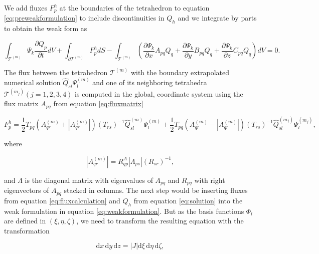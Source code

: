 We add fluxes $F_p^h$ at the boundaries of the tetrahedron to equation \ref{eq:preweakformulation} to include discontinuities in $Q_h$ and we integrate by parts to obtain the weak form as

\begin{equation}
    \int_{\mathcal{T}^{\left(m\right)}} \Psi_k \frac{\partial Q_p}{\partial t} dV + \int_{\partial \mathcal{T}^{\left(m\right)}} F_p^h dS
    - \int_{\mathcal{T}^{\left(m\right)}} \left(\frac{\partial \Psi_k}{\partial x} A_{pq}Q_q + \frac{\partial \Psi_k}{\partial y}B_{pq}Q_q
    + \frac{\partial \Psi_k}{\partial z}C_{pq}Q_q\right) dV = 0.
\label{eq:weakformulation}
\end{equation}

The flux between the tetrahedron $\mathcal{T}^{\left(m\right)}$ with the boundary extrapolated numerical solution $\hat{Q}_{sl} \Psi_l^{\left(m\right)}$
and one of its neighboring tetrahedra $\mathcal{T}^{\left(m_j\right)} \left(j=1,2,3,4\right)$ is computed in the global, coordinate system using the flux
matrix $A_{pq}$ from equation \ref{eq:fluxmatrix}

\begin{equation}
    F_p^h = \frac{1}{2} T_{pq} \left(A_{qr}^{\left(m\right)} + \left|A_{qr}^{\left(m\right)}\right|\right)\left(T_{rs}\right)^{-1}
    \hat{Q}_{sl}^{\left(m\right)} \Psi_l^{\left(m\right)} + \frac{1}{2}T_{pq}\left(A_{qr}^{\left(m\right)} - \left|A_{qr}^{\left(m\right)}\right|\right)
    \left(T_{rs}\right)^{-1}\hat{Q}_{sl}^{\left(m_j\right)}\Psi_l^{\left(m_j\right)},
    \label{eq:fluxcalculation}
\end{equation}

where

\begin{equation}
\left|A_{qr}^{\left(m\right)}\right| = R_{qp}^A \left|\Lambda_{ps}\right| \left(R_{sr}\right)^{-1},
\end{equation}
    
and $\Lambda$ is the diagonal matrix with eigenvalues of $A_{pq}$ and $R_{pq}$ with right eigenvectors of $A_{pq}$ stacked in columns.
The next step would be inserting fluxes from equation \ref{eq:fluxcalculation} and $Q_h$ from equation \ref{eq:solution} into the weak
formulation in equation \ref{eq:weakformulation}. But as the basis functions $\Phi_l$ are defined in $\left(\xi, \eta, \zeta\right)$, we need
to transform the resulting equation with the transformation

\begin{equation}
    \text{d}x\, \text{d}y \, \text{d}z = \left|J\right| \text{d}\xi \,\text{d}\eta \,\text{d}\zeta,
\end{equation}


